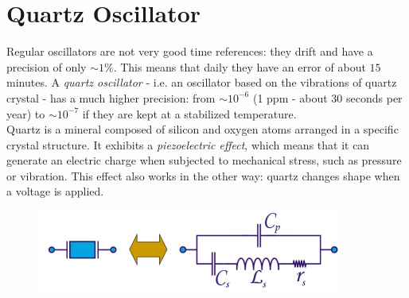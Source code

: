 \section{Quartz Oscillator}
Regular oscillators are not very good time references: they drift and have a precision of only $\sim 1\%$. This means that daily they have an error of about $15$ minutes. A \emph{quartz oscillator} - i.e. an oscillator based on the vibrations of quartz crystal - has a much higher precision: from $\sim 10^{-6}$ (1 ppm - about 30 seconds per year) to $\sim 10^{-7}$ if they are kept at a stabilized temperature.\\
Quartz is a mineral composed of silicon and oxygen atoms arranged in a specific crystal structure.  It exhibits a \emph{piezoelectric effect}, which means that it can generate an electric charge when subjected to mechanical stress, such as pressure or vibration. This effect also works in the other way: quartz changes shape when a voltage is applied.

\begin{figure}[h!]
	\centering
	\includegraphics[width=10cm]{figures/ch11/quartz1.jpg}
	\caption{}
	\label{fig:quartz1}
\end{figure}

